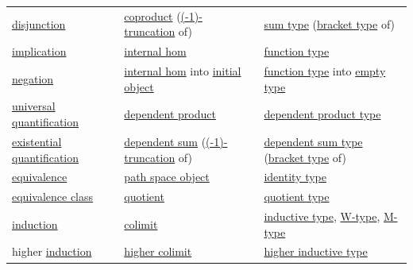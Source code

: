 \documentclass[a4paper,14pt,oneside]{book}
\begin{document}
\begin{longtable}{lll}
\href{https://ncatlab.org/nlab/show/disjunction}{disjunction} & \href{https://ncatlab.org/nlab/show/coproduct}{coproduct} (\href{https://ncatlab.org/nlab/show/\%28-1\%29-truncation}{(-1)-truncation} of) & \href{https://ncatlab.org/nlab/show/sum+type}{sum type} (\href{https://ncatlab.org/nlab/show/bracket+type}{bracket type} of)\\
\href{https://ncatlab.org/nlab/show/implication}{implication} & \href{https://ncatlab.org/nlab/show/internal+hom}{internal hom} & \href{https://ncatlab.org/nlab/show/function+type}{function type}\\
\href{https://ncatlab.org/nlab/show/negation}{negation} & \href{https://ncatlab.org/nlab/show/internal+hom}{internal hom} into \href{https://ncatlab.org/nlab/show/initial+object}{initial object} & \href{https://ncatlab.org/nlab/show/function+type}{function type} into \href{https://ncatlab.org/nlab/show/empty+type}{empty type}\\
\href{https://ncatlab.org/nlab/show/universal+quantification}{universal quantification} & \href{https://ncatlab.org/nlab/show/dependent+product}{dependent product} & \href{https://ncatlab.org/nlab/show/dependent+product+type}{dependent product type}\\
\href{https://ncatlab.org/nlab/show/existential+quantification}{existential quantification} & \href{https://ncatlab.org/nlab/show/dependent+sum}{dependent sum} (\href{https://ncatlab.org/nlab/show/\%28-1\%29-truncation}{(-1)-truncation} of) & \href{https://ncatlab.org/nlab/show/dependent+sum+type}{dependent sum type} (\href{https://ncatlab.org/nlab/show/bracket+type}{bracket type} of)\\
\href{https://ncatlab.org/nlab/show/equivalence}{equivalence} & \href{https://ncatlab.org/nlab/show/path+space+object}{path space object} & \href{https://ncatlab.org/nlab/show/identity+type}{identity type}\\
\href{https://ncatlab.org/nlab/show/equivalence+class}{equivalence class} & \href{https://ncatlab.org/nlab/show/quotient}{quotient} & \href{https://ncatlab.org/nlab/show/quotient+type}{quotient type}\\
\href{https://ncatlab.org/nlab/show/induction}{induction} & \href{https://ncatlab.org/nlab/show/colimit}{colimit} & \href{https://ncatlab.org/nlab/show/inductive+type}{inductive type}, \href{https://ncatlab.org/nlab/show/W-type}{W-type}, \href{https://ncatlab.org/nlab/show/M-type}{M-type}\\
higher \href{https://ncatlab.org/nlab/show/induction}{induction} & \href{https://ncatlab.org/nlab/show/\%28infinity\%2C1\%29-colimit}{higher colimit} & \href{https://ncatlab.org/nlab/show/higher+inductive+type}{higher inductive type}\\

\end{longtable}
\end{document}

